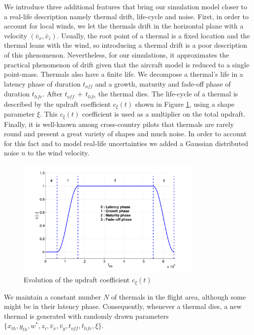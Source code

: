 \documentclass[a4paper, 10pt, conference]{ieeeconf}
\begin{document}
We introduce three additional features that bring our simulation model closer to a real-life description {\color{red}namely} thermal drift, life-cycle and noise.
First, in order to account for local winds, we let the thermals drift in the horizontal plane with a velocity $(\bar{v}_x, \bar{v}_z)$. Usually, the root point of a thermal is a fixed location and the thermal leans with the wind, so introducing a thermal drift is a poor description of this phenomenon. Nevertheless, for our simulations, it approximates the practical phenomenon of drift {\color{red}given that the aircraft model is reduced to a single point-mass}.
Thermals also have a finite life. We decompose a thermal's life in a latency phase of duration $t_{\textit{off}}$ and a growth, maturity and fade-off phase of duration $t_{\textit{life}}$. After $t_{\textit{off}} \, + \, t_{\textit{life}}$ the thermal dies. The life-cycle of a thermal is described by the updraft coefficient $c_\xi(t)$ shown in Figure \ref{fig:life_cycle}, using a shape parameter $\xi$. This $c_\xi(t)$ coefficient is used as a multiplier on the total updraft.
Finally, it is well-known among cross-country pilots that thermals are rarely round and present a great variety of shapes and much noise. In order to account for this fact and to model real-life uncertainties we added a Gaussian distributed noise $n$ to {\color{red}the wind velocity}.

\begin{figure}%
\begin{center}
 \includegraphics[width=9cm]{img/lifeCycle.pdf}
\end{center}
\caption{Evolution of the updraft coefficient $c_\xi(t)$}
\label{fig:life_cycle}
\end{figure}

We maintain a constant number $N$ of thermals in the flight area, although some might be in their latency phase. Consequently, whenever a thermal dies, a new thermal is generated with randomly drawn parameters $\{x_{th},y_{th}, w^*, z_i, \bar{v}_x, \bar{v}_y, t_{\textit{off}}, t_{\textit{life}}, \xi \}$.
\end{document}
